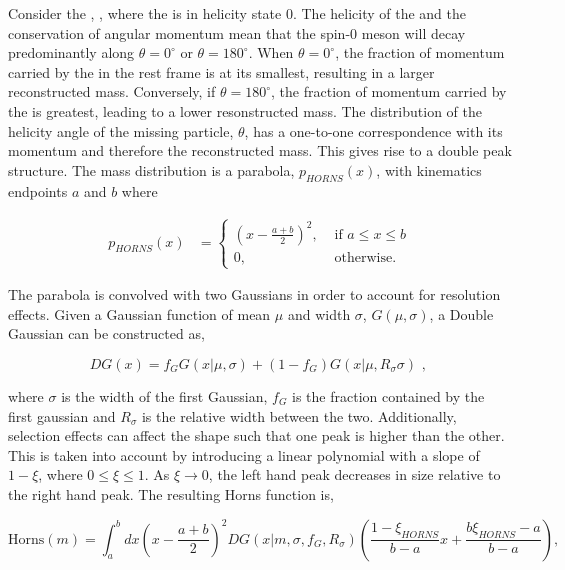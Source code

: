 Consider the \decay{\Bm}{\Dstarz\Kstarm}, \decay{\Dstarz}{\Dz\piz}, where the \Dstarz is in helicity state 0. The helicity of the \Dstarz and the conservation of angular momentum mean that the spin-0 \piz meson will decay predominantly along $\theta = 0^{\circ}$ or $\theta = 180^{\circ}$. When $\theta = 0^{\circ}$, the fraction of momentum carried by the \piz in the \B rest frame is at its smallest, resulting in a larger reconstructed \B mass. Conversely, if $\theta = 180^{\circ}$, the fraction of momentum carried by the \piz is greatest, leading to a lower resonstructed \B mass. The distribution of the helicity angle of the missing particle, $\theta$, has a one-to-one correspondence with its momentum and therefore the reconstructed \B mass. This gives rise to a double peak structure. The \B mass distribution is a parabola, $p_{HORNS}(x)$, with kinematics endpoints $a$ and $b$ where

\begin{align}
p_{HORNS}(x) &= \begin{cases}
\left(x - \frac{a+b}{2}\right)^2, & \text{ if $a \leq x \leq b$}\\ 	
0, & \text{ otherwise.}
\end{cases} 
\end{align}

The parabola is convolved with two Gaussians in order to account for resolution effects. Given a Gaussian function of mean $\mu$ and width $\sigma$, $G(\mu,\sigma)$, a Double Gaussian can be constructed as,

\begin{equation}
DG(x) = f_G G(x|\mu,\sigma) + \left(1-f_G\right) G(x|\mu,R_{\sigma}\sigma) \text{ , }
\end{equation}

where $\sigma$ is the width of the first Gaussian, $f_G$ is the fraction contained by the first gaussian and $R_{\sigma}$ is the relative width between the two. Additionally, selection effects can affect the shape such that one peak is higher than the other. This is taken into account by introducing a linear polynomial with a slope of $1 - \xi$, where $0 \leq \xi \leq 1$. As $\xi \rightarrow 0$, the left hand peak decreases in size relative to the right hand peak. The resulting Horns function is,

\begin{equation}
\text{Horns}(m) = \int_a^b dx \left(x - \frac{a+b}{2}\right)^2 DG(x|m,\sigma,f_G,R_{\sigma}) \left( \frac{1 - \xi_{HORNS}}{b - a}x + \frac{b\xi_{HORNS} - a}{b - a}\right),
\end{equation}

